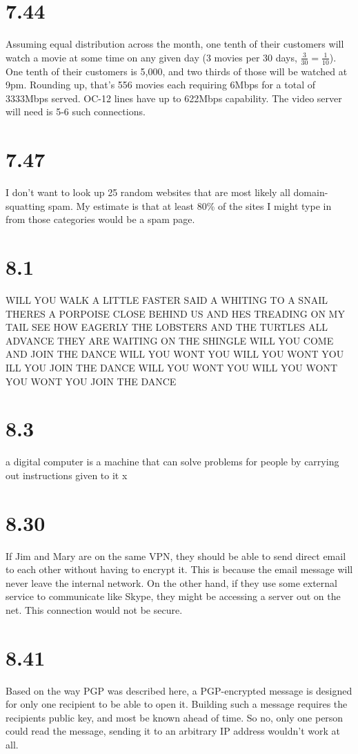 \documentclass[a4paper,12pt]{article}
\begin{document}
\section*{7.44}
Assuming equal distribution across the month, one tenth of their
customers will watch a movie at some time on any given day (3 movies
per 30 days, $\frac{3}{30} = \frac{1}{10}$). One tenth of their
customers is 5,000, and two thirds of those will be watched at
9pm. Rounding up, that's 556 movies each requiring 6Mbps for a total
of 3333Mbps served. OC-12 lines have up to 622Mbps capability. The
video server will need is 5-6 such connections.

\section*{7.47}
I don't want to look up 25 random websites that are most likely all
domain-squatting spam. My estimate is that at least 80\% of the sites
I might type in from those categories would be a spam page.

\section*{8.1}
WILL YOU WALK A LITTLE FASTER SAID A WHITING TO A SNAIL THERES A
PORPOISE CLOSE BEHIND US AND HES TREADING ON MY TAIL SEE HOW EAGERLY
THE LOBSTERS AND THE TURTLES ALL ADVANCE THEY ARE WAITING ON THE
SHINGLE WILL YOU COME AND JOIN THE DANCE WILL YOU WONT YOU WILL YOU
WONT YOU ILL YOU JOIN THE DANCE WILL YOU WONT YOU WILL YOU WONT YOU
WONT YOU JOIN THE DANCE

\section*{8.3}
a digital computer is a machine that can solve problems for people by
carrying out instructions given to it x

\section*{8.30}
If Jim and Mary are on the same VPN, they should be able to send
direct email to each other without having to encrypt it. This is
because the email message will never leave the internal network. On
the other hand, if they use some external service to communicate like
Skype, they might be accessing a server out on the net. This
connection would not be secure.

\section*{8.41}
Based on the way PGP was described here, a PGP-encrypted message is
designed for only one recipient to be able to open it. Building such a
message requires the recipients public key, and most be known ahead of
time. So no, only one person could read the message, sending it to an
arbitrary IP address wouldn't work at all.
\end{document}
